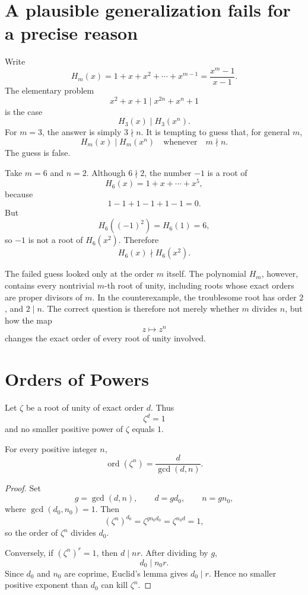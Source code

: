 
\section{A plausible generalization fails for a precise reason}

Write
\[
  H_m(x)=1+x+x^2+\cdots+x^{m-1}
  =\frac{x^m-1}{x-1}.
\]
The elementary problem
\[
  x^2+x+1\mid x^{2n}+x^n+1
\]
is the case
\[
  H_3(x)\mid H_3(x^n).
\]
For \(m=3\), the answer is simply \(3\nmid n\).  It is tempting to guess that, for general \(m\),
\[
  H_m(x)\mid H_m(x^n)
  \quad\text{whenever}\quad
  m\nmid n.
\]
The guess is false.

Take \(m=6\) and \(n=2\).  Although \(6\nmid2\), the number \(-1\) is a root of
\[
  H_6(x)=1+x+\cdots+x^5,
\]
because
\[
  1-1+1-1+1-1=0.
\]
But
\[
  H_6((-1)^2)=H_6(1)=6,
\]
so \(-1\) is not a root of \(H_6(x^2)\).  Therefore
\[
  H_6(x)\nmid H_6(x^2).
\]

The failed guess looked only at the order \(m\) itself.  The polynomial \(H_m\), however, contains every nontrivial \(m\)-th root of unity, including roots whose exact orders are proper divisors of \(m\).  In the counterexample, the troublesome root has order \(2\), and \(2\mid n\).  The correct question is therefore not merely whether \(m\) divides \(n\), but how the map
\[
  z\longmapsto z^n
\]
changes the exact order of every root of unity involved.

\section{Orders of Powers}

Let \(\zeta\) be a root of unity of exact order \(d\).  Thus
\[
  \zeta^d=1
\]
and no smaller positive power of \(\zeta\) equals \(1\).

\begin{theorem}
For every positive integer \(n\),
\[
  \operatorname{ord}(\zeta^n)
  =\frac{d}{\gcd(d,n)}.
\]
\end{theorem}

\begin{proof}
Set
\[
  g=\gcd(d,n),
  \qquad
  d=gd_0,
  \qquad
  n=gn_0,
\]
where \(\gcd(d_0,n_0)=1\).  Then
\[
  (\zeta^n)^{d_0}
  =\zeta^{g n_0 d_0}
  =\zeta^{n_0d}=1,
\]
so the order of \(\zeta^n\) divides \(d_0\).

Conversely, if \((\zeta^n)^r=1\), then \(d\mid nr\).  After dividing by \(g\),
\[
  d_0\mid n_0r.
\]
Since \(d_0\) and \(n_0\) are coprime, Euclid's lemma gives \(d_0\mid r\).  Hence no smaller positive exponent than \(d_0\) can kill \(\zeta^n\).
\end{proof}

